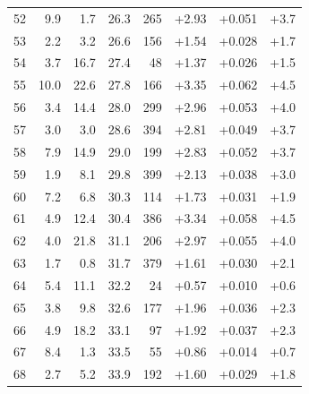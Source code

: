 \begin{longtable}{@{}r r r r r r r r@{}}
52 & 9.9 & 1.7 & 26.3 & 265 & \cellcolor{green!41}+2.93 & \cellcolor{yellow!41}+0.051 & \cellcolor{orange!37}+3.7 \\
53 & 2.2 & 3.2 & 26.6 & 156 & \cellcolor{green!27}+1.54 & \cellcolor{yellow!27}+0.028 & \cellcolor{orange!23}+1.7 \\
54 & 3.7 & 16.7 & 27.4 & 48 & \cellcolor{green!25}+1.37 & \cellcolor{yellow!26}+0.026 & \cellcolor{orange!22}+1.5 \\
55 & 10.0 & 22.6 & 27.8 & 166 & \cellcolor{green!45}+3.35 & \cellcolor{yellow!47}+0.062 & \cellcolor{orange!42}+4.5 \\
56 & 3.4 & 14.4 & 28.0 & 299 & \cellcolor{green!41}+2.96 & \cellcolor{yellow!42}+0.053 & \cellcolor{orange!39}+4.0 \\
57 & 3.0 & 3.0 & 28.6 & 394 & \cellcolor{green!40}+2.81 & \cellcolor{yellow!40}+0.049 & \cellcolor{orange!37}+3.7 \\
58 & 7.9 & 14.9 & 29.0 & 199 & \cellcolor{green!40}+2.83 & \cellcolor{yellow!41}+0.052 & \cellcolor{orange!37}+3.7 \\
59 & 1.9 & 8.1 & 29.8 & 399 & \cellcolor{green!33}+2.13 & \cellcolor{yellow!33}+0.038 & \cellcolor{orange!32}+3.0 \\
60 & 7.2 & 6.8 & 30.3 & 114 & \cellcolor{green!29}+1.73 & \cellcolor{yellow!29}+0.031 & \cellcolor{orange!25}+1.9 \\
61 & 4.9 & 12.4 & 30.4 & 386 & \cellcolor{green!45}+3.34 & \cellcolor{yellow!45}+0.058 & \cellcolor{orange!43}+4.5 \\
62 & 4.0 & 21.8 & 31.1 & 206 & \cellcolor{green!41}+2.97 & \cellcolor{yellow!43}+0.055 & \cellcolor{orange!39}+4.0 \\
63 & 1.7 & 0.8 & 31.7 & 379 & \cellcolor{green!27}+1.61 & \cellcolor{yellow!28}+0.030 & \cellcolor{orange!26}+2.1 \\
64 & 5.4 & 11.1 & 32.2 & 24 & \cellcolor{green!17}+0.57 & \cellcolor{yellow!16}+0.010 & \cellcolor{orange!16}+0.6 \\
65 & 3.8 & 9.8 & 32.6 & 177 & \cellcolor{green!31}+1.96 & \cellcolor{yellow!32}+0.036 & \cellcolor{orange!27}+2.3 \\
66 & 4.9 & 18.2 & 33.1 & 97 & \cellcolor{green!30}+1.92 & \cellcolor{yellow!32}+0.037 & \cellcolor{orange!27}+2.3 \\
67 & 8.4 & 1.3 & 33.5 & 55 & \cellcolor{green!20}+0.86 & \cellcolor{yellow!19}+0.014 & \cellcolor{orange!17}+0.7 \\
68 & 2.7 & 5.2 & 33.9 & 192 & \cellcolor{green!27}+1.60 & \cellcolor{yellow!28}+0.029 & \cellcolor{orange!24}+1.8 \\

\end{longtable}
